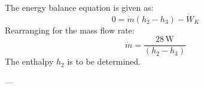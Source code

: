 The energy balance equation is given as:  
\[
0 = \dot{m} (h_2 - h_3) - \dot{W}_K
\]  
Rearranging for the mass flow rate:  
\[
\dot{m} = \frac{28 \, \text{W}}{(h_2 - h_3)}
\]  
The enthalpy \( h_2 \) is to be determined.

---